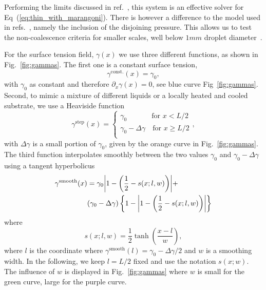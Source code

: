 \documentclass[twocolumn,amsmath,amssymb,showpacs,pre,nofootinbib,superscriptaddress]{revtex4-1} %
\begin{document}
Performing the limits discussed in ref.~\cite{PhysRevE.100.033313, PhysRevE.104.034801}, this system is an effective solver for Eq~(\ref{eq:thin_with_marangoni}).
There is however a difference to the model used in refs.~\cite{doi:10.1021/la500459v, karpitschka2014sharp}, namely the inclusion of the disjoining pressure. 
This allows us to test the non-coalescence criteria for smaller scales, well below $1mm$ droplet diameter~\cite{karpitschka2014sharp}.

For the surface tension field, $\gamma(x)$ we use three different functions, as shown in Fig.~\ref{fig:gammas}.
The first one is a constant surface tension, 
\begin{equation}\label{eq:gamma_const}
    \gamma^{\text{const.}}(x) = \gamma_0,
\end{equation}
with $\gamma_0$ as constant and therefore $\partial_x\gamma(x) = 0$, see blue curve Fig~\ref{fig:gammas}.
Second, to mimic a mixture of different liquids or a locally heated and cooled substrate, we use a Heaviside function
\begin{equation}\label{eq:gamma_step}
    \gamma^{\text{step}}(x) = \begin{cases}
    \gamma_0\quad~~\qquad \text{for $x < L/2$}\\
    \gamma_0 - \Delta\gamma \quad \text{for $x \ge L/2$}\\
    \end{cases},
\end{equation}
with $\Delta\gamma$ is a small portion of $\gamma_0$, given by the orange curve in Fig.~\ref{fig:gammas}.
The third function interpolates smoothly between the two values $\gamma_0$ and $\gamma_0 -\Delta\gamma$ using a tangent hyperbolicus
\begin{align}\label{eq:gamma_tanh}
    \gamma^{\text{smooth}}(x) &= \gamma_0\abs{1 - \left(\frac{1}{2} - s(x;l,w)\right)} + \nonumber\\
    &(\gamma_0 - \Delta\gamma)\left\{1 - \abs{1 - \left(\frac{1}{2} - s(x;l,w)\right)}\right\} 
\end{align}
where
\begin{equation}\label{eq:smoothing}
    s(x;l,w) = \frac{1}{2}\tanh\left(\frac{x - l}{w}\right),
\end{equation}
where $l$ is the coordinate where $\gamma^{\text{smooth}}(l) = \gamma_0 -\Delta\gamma/2$ and $w$ is a smoothing width. 
In the following, we keep $l=L/2$ fixed and use the notation $s(x;w)$.
The influence of $w$ is displayed in Fig.~\ref{fig:gammas} where $w$ is small for the green curve, large for the purple curve. 
\end{document}
